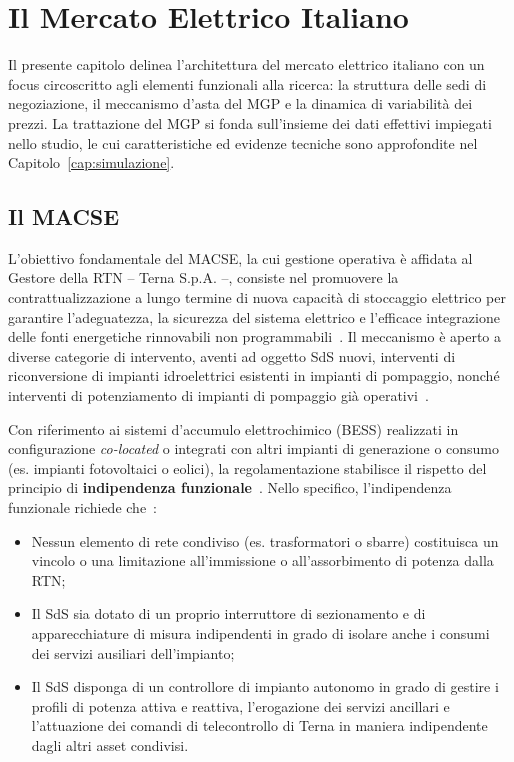 \chapter{Il Mercato Elettrico Italiano}
\label{cap:mercato}

Il presente capitolo delinea l'architettura del mercato elettrico italiano con un focus circoscritto agli elementi funzionali alla ricerca: la struttura delle sedi di negoziazione, il meccanismo d'asta del \acf{MGP} e la dinamica di variabilità dei prezzi. La trattazione del \ac{MGP} si fonda sull'insieme dei dati effettivi impiegati nello studio, le cui caratteristiche ed evidenze tecniche sono approfondite nel Capitolo~\ref{cap:simulazione}.

\section{Il \acf{MACSE}}

L'obiettivo fondamentale del \ac{MACSE}, la cui gestione operativa è affidata al Gestore della \acf{RTN} -- Terna S.p.A. --, consiste nel promuovere la contrattualizzazione a lungo termine di nuova capacità di stoccaggio elettrico per garantire l'adeguatezza, la sicurezza del sistema elettrico e l'efficace integrazione delle fonti energetiche rinnovabili non programmabili~\cite{arera247, terna_disciplina}. Il meccanismo è aperto a diverse categorie di intervento, aventi ad oggetto \ac{SdS} nuovi, interventi di riconversione di impianti idroelettrici esistenti in impianti di pompaggio, nonché interventi di potenziamento di impianti di pompaggio già operativi~\cite{terna_disciplina}.

Con riferimento ai sistemi d'accumulo elettrochimico (\ac{BESS}) realizzati in configurazione \textit{co-located} o integrati con altri impianti di generazione o consumo (es. impianti fotovoltaici o eolici), la regolamentazione stabilisce il rispetto del principio di \textbf{indipendenza funzionale}~\cite{dlgs210, terna_disciplina}. Nello specifico, l'indipendenza funzionale richiede che~\cite{dlgs210}:
\begin{itemize}
    \item Nessun elemento di rete condiviso (es. trasformatori o sbarre) costituisca un vincolo o una limitazione all'immissione o all'assorbimento di potenza dalla \acf{RTN};
    \item Il \ac{SdS} sia dotato di un proprio interruttore di sezionamento e di apparecchiature di misura indipendenti in grado di isolare anche i consumi dei servizi ausiliari dell'impianto;
    \item Il \ac{SdS} disponga di un controllore di impianto autonomo in grado di gestire i profili di potenza attiva e reattiva, l'erogazione dei servizi ancillari e l'attuazione dei comandi di telecontrollo di Terna in maniera indipendente dagli altri asset condivisi.
\end{itemize}

